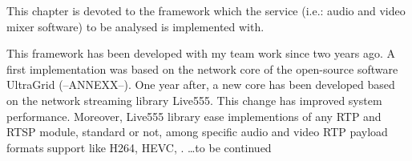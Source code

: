 This chapter is devoted to the framework which the service (i.e.: audio and video mixer software) to be analysed is implemented with. 

This framework has been developed with my team work since two years ago. A first implementation was based on the network core of the open-source software UltraGrid (--ANNEXX--). One year after, a new core has been developed based on the network streaming library Live555. This change has improved system performance. Moreover, Live555 library ease implementions of any RTP and RTSP module, standard or not, among specific audio and video RTP payload formats support like H264, HEVC, .
\ldots to be continued





